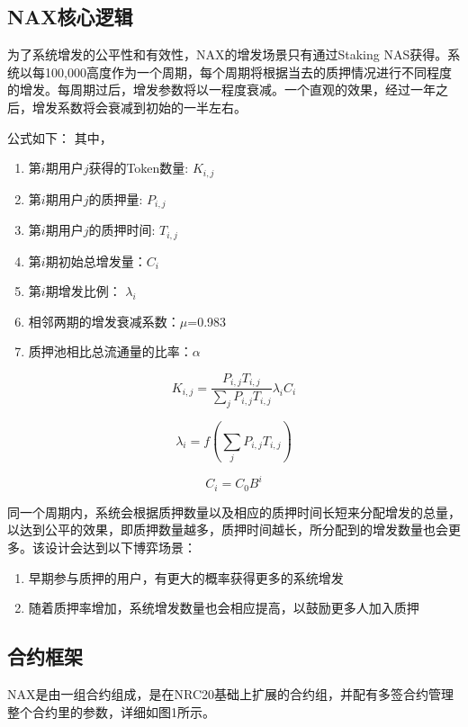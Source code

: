 \subsection{NAX核心逻辑}
为了系统增发的公平性和有效性，NAX的增发场景只有通过Staking NAS获得。系统以每100,000高度作为一个周期，每个周期将根据当去的质押情况进行不同程度的增发。每周期过后，增发参数将以一程度衰减。一个直观的效果，经过一年之后，增发系数将会衰减到初始的一半左右。

公式如下：
其中，

\begin{enumerate}
   \item 第\(i\)期用户\(j\)获得的Token数量: \(K_{i,j}\)
   \item 第\(i\)期用户\(j\)的质押量: \(P_{i,j}\)
   \item 第\(i\)期用户\(j\)的质押时间: \(T_{i,j}\)
   \item 第\(i\)期初始总增发量：\(C_i\)
   \item 第\(i\)期增发比例： \(\lambda_i\)
   \item 相邻两期的增发衰减系数：$\mu$=0.983
   \item 质押池相比总流通量的比率：$\alpha$
\end{enumerate}

\begin{equation}
  K_{i,j} = \frac{P_{i,j} T_{i,j}}{\sum_j P_{i,j} T_{i,j}} \lambda_i C_i
\end{equation}

\begin{equation}
  \lambda_i = f(\sum_j P_{i,j} T_{i,j})
\end{equation}

\begin{equation}
  C_i = C_0 B^i
\end{equation}

同一个周期内，系统会根据质押数量以及相应的质押时间长短来分配增发的总量，以达到公平的效果，即质押数量越多，质押时间越长，所分配到的增发数量也会更多。该设计会达到以下博弈场景：
\begin{enumerate}
	\item 早期参与质押的用户，有更大的概率获得更多的系统增发
	\item 随着质押率增加，系统增发数量也会相应提高，以鼓励更多人加入质押
\end{enumerate}

\subsection{合约框架}
NAX是由一组合约组成，是在NRC20基础上扩展的合约组，并配有多签合约管理整个合约里的参数，详细如图1所示。

